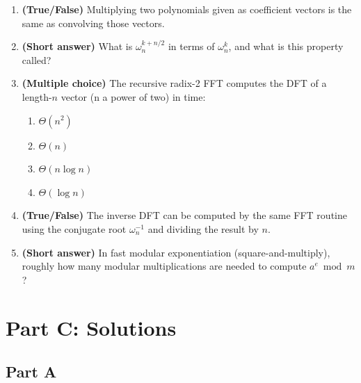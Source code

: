 \documentclass[11pt]{article}
\begin{document}
\begin{enumerate}[label=\textbf{B\arabic*.}, leftmargin=2.2em]
\item \textbf{(True/False)} Multiplying two polynomials given as coefficient vectors is the
same as convolving those vectors.

\item \textbf{(Short answer)} What is $\omega_n^{k + n/2}$ in terms of $\omega_n^k$, and what
is this property called?

\item \textbf{(Multiple choice)} The recursive radix-2 FFT computes the DFT of a length-$n$
vector (n a power of two) in time:
\begin{enumerate}[label=(\alph*)]
    \item $\Theta(n^2)$
    \item $\Theta(n)$
    \item $\Theta(n \log n)$
    \item $\Theta(\log n)$
\end{enumerate}

\item \textbf{(True/False)} The inverse DFT can be computed by the same FFT routine using the
conjugate root $\omega_n^{-1}$ and dividing the result by $n$.

\item \textbf{(Short answer)} In fast modular exponentiation (square-and-multiply), roughly
how many modular multiplications are needed to compute $a^e \bmod m$?

\end{enumerate}

\newpage
\section*{Part C: Solutions}

\subsection*{Part A}
\end{document}
